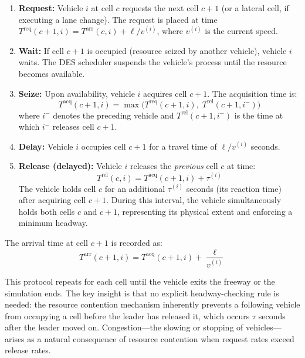 \documentclass[review,authoryear]{elsarticle}
\newcommand{\Treq}{T^{\text{req}}}
\newcommand{\Tacq}{T^{\text{acq}}}
\newcommand{\Tarr}{T^{\text{arr}}}
\newcommand{\Trel}{T^{\text{rel}}}
\begin{document}
\begin{enumerate}
    \item \textbf{Request:} Vehicle $i$ at cell $c$ requests the next cell $c+1$ (or a lateral cell, if executing a lane change). The request is placed at time $\Treq(c+1, i) = \Tarr(c, i) + \ell / v^{(i)}$, where $v^{(i)}$ is the current speed.

    \item \textbf{Wait:} If cell $c+1$ is occupied (resource seized by another vehicle), vehicle $i$ waits. The DES scheduler suspends the vehicle's process until the resource becomes available.

    \item \textbf{Seize:} Upon availability, vehicle $i$ acquires cell $c+1$. The acquisition time is:
    \begin{equation}
        \Tacq(c+1, i) = \max\!\big(\Treq(c+1, i),\; \Trel(c+1, i^{-})\big)
        \label{eq:acquisition}
    \end{equation}
    where $i^{-}$ denotes the preceding vehicle and $\Trel(c+1, i^{-})$ is the time at which $i^{-}$ releases cell $c+1$.

    \item \textbf{Delay:} Vehicle $i$ occupies cell $c+1$ for a travel time of $\ell / v^{(i)}$ seconds.

    \item \textbf{Release (delayed):} Vehicle $i$ releases the \emph{previous} cell $c$ at time:
    \begin{equation}
        \Trel(c, i) = \Tacq(c+1, i) + \tau^{(i)}
        \label{eq:delayed_release}
    \end{equation}
    The vehicle holds cell $c$ for an additional $\tau^{(i)}$ seconds (its reaction time) after acquiring cell $c+1$. During this interval, the vehicle simultaneously holds both cells $c$ and $c+1$, representing its physical extent and enforcing a minimum headway.
\end{enumerate}

The arrival time at cell $c+1$ is recorded as:
\begin{equation}
    \Tarr(c+1, i) = \Tacq(c+1, i) + \frac{\ell}{v^{(i)}}
    \label{eq:arrival}
\end{equation}

This protocol repeats for each cell until the vehicle exits the freeway or the simulation ends. The key insight is that no explicit headway-checking rule is needed: the resource contention mechanism inherently prevents a following vehicle from occupying a cell before the leader has released it, which occurs $\tau$ seconds after the leader moved on. Congestion---the slowing or stopping of vehicles---arises as a natural consequence of resource contention when request rates exceed release rates.
\end{document}
